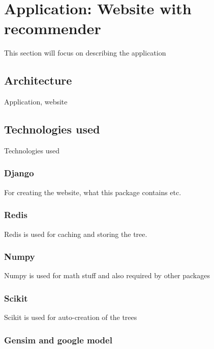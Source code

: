 \chapter{Application: Website with recommender}
\label{chap:app}

This section will focus on describing the application

\section{Architecture}
\label{sec:app_architecture}

Application, website

\section{Technologies used}
\label{sec:app_technology}

Technologies used

\subsection{Django}
\label{subsec:app_technology_django}

For creating the website, what this package contains etc.

\subsection{Redis}
\label{subsec:app_technology_redis}

Redis is used for caching and storing the tree.

\subsection{Numpy}
\label{subsec:app_technology_numpy}

Numpy is used for math stuff and also required by other packages

\subsection{Scikit}
\label{subsec:app_technology_scikit}

Scikit is used for auto-creation of the trees

\subsection{Gensim and google model}
\label{subsec:app_technology_gensim}

